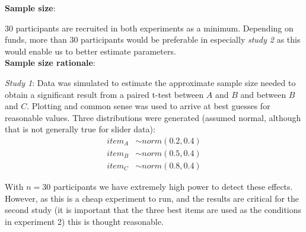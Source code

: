 \documentclass[12pt]{article}
\begin{document}
\textbf{Sample size}:

$30$ participants are recruited in both experiments
as a minimum. Depending on funds, more than $30$
participants would be preferable in especially
\emph{study 2} as this would
enable us to better estimate parameters. \\

\textbf{Sample size rationale}:

\emph{Study 1}: Data was simulated to estimate the
approximate sample size needed to obtain
a significant result from a paired t-test
between $A$ and  $B$ and between $B$ and  $C$.
Plotting and common
sense was used to arrive at best guesses for
reasonable values. Three distributions were generated
(assumed normal, although that is not generally true
for slider data):
\begin{equation} \label{eq3}
\begin{split}
	item_A &\sim norm(0.2, 0.4) \\
	item_B &\sim norm(0.5, 0.4) \\
	item_C &\sim norm(0.8, 0.4)
\end{split}
\end{equation}

With $n = 30$ participants we have extremely
high power to detect these effects. However,
as this is a cheap experiment to run, and the
results are critical for the second study
(it is important that the three best items are
used as the conditions in experiment 2)
this is thought reasonable.

\vspace{3mm}
\end{document}
